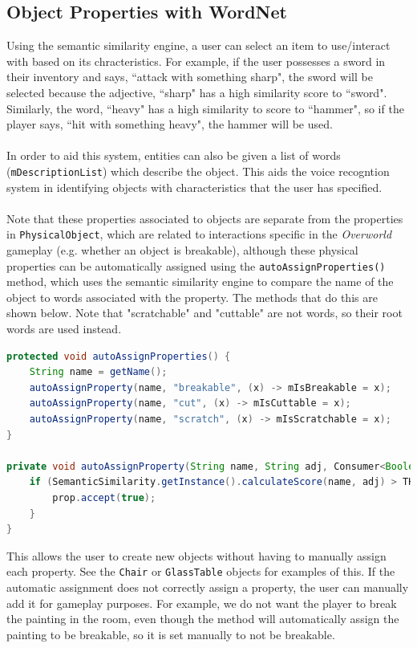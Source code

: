 \documentclass[11pt]{article}
\begin{document}
\subsection{Object Properties with WordNet}

Using the semantic similarity engine, a user can select an item to use/interact with based on its chracteristics. For example, if the user possesses a sword in their inventory and says, ``attack with something sharp", the sword will be selected because the adjective, ``sharp" has a high similarity score to ``sword". Similarly, the word, ``heavy" has a high similarity to score to ``hammer", so if the player says, ``hit with something heavy", the hammer will be used.
\\
\\
In order to aid this system, entities can also be given a list of words (\texttt{mDescriptionList}) which describe the object.  This aids the voice recogntion system in identifying objects with characteristics that the user has specified.
\\
\\
Note that these properties associated to objects are separate from the properties in \texttt{PhysicalObject}, which are related to interactions specific in the \textit{Overworld} gameplay (e.g. whether an object is breakable), although these physical properties can be automatically assigned using the \texttt{autoAssignProperties()} method, which uses the semantic similarity engine to compare the name of the object to words associated with the property. The methods that do this are shown below. Note that "scratchable" and "cuttable" are not words, so their root words are used instead.

\begin{lstlisting}[language=Java, label=lst:auto-assign]
protected void autoAssignProperties() {
    String name = getName();
    autoAssignProperty(name, "breakable", (x) -> mIsBreakable = x);
    autoAssignProperty(name, "cut", (x) -> mIsCuttable = x);
    autoAssignProperty(name, "scratch", (x) -> mIsScratchable = x);
}

private void autoAssignProperty(String name, String adj, Consumer<Boolean> prop) {
    if (SemanticSimilarity.getInstance().calculateScore(name, adj) > THRESHOLD) {
        prop.accept(true);
    }
}
\end{lstlisting}

This allows the user to create new objects without having to manually assign each property. See the \texttt{Chair} or \texttt{GlassTable} objects for examples of this. If the automatic assignment does not correctly assign a property, the user can manually add it for gameplay purposes. For example, we do not want the player to break the painting in the room, even though the method will automatically assign the painting to be breakable, so it is set manually to not be breakable.
\end{document}
